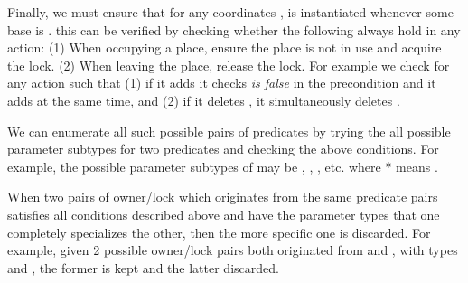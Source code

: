 
Finally, we must ensure that for any coordinates ,
 is instantiated whenever some base  is .
this can be verified by checking whether the following always hold in any action: 
(1) When occupying a place, ensure the place is not in use and acquire the lock.
(2) When leaving the place, release the lock.
For example we check for any action such that (1) if it adds 
it checks  {\em is false} in the precondition and
it adds  at the same time,
and (2) if it deletes ,
it simultaneously deletes .

We can enumerate all such possible pairs of predicates by
trying the all possible parameter subtypes for two predicates
and checking the above conditions.
For example, the possible parameter subtypes of 
may be \pddl{(* * *)}, , ,
 etc. where * means . %

When two pairs of owner/lock which originates from the same predicate pairs
satisfies all conditions described above and
have the parameter types that one completely specializes the other,
then the more specific one is discarded.
For example, given 2 possible owner/lock pairs both originated from  and ,
with types  and
 ,
the former is kept and the latter discarded.

